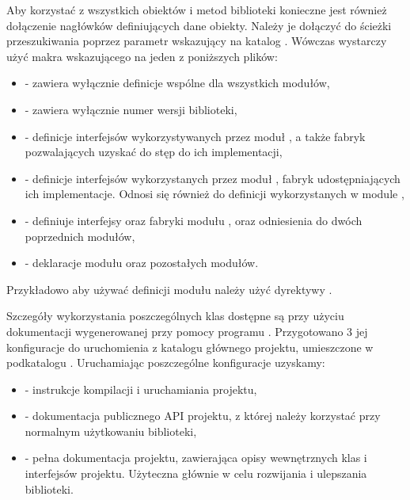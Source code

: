 \documentclass[polish]{standalone}
\begin{document}
Aby korzystać z wszystkich obiektów i metod biblioteki konieczne jest również dołączenie nagłówków definiujących
dane obiekty. Należy je dołączyć do ścieżki przeszukiwania poprzez parametr 
wskazujący na katalog . Wówczas wystarczy użyć makra  wskazującego na jeden z poniższych
plików:
\begin{itemize}
\item {} - zawiera wyłącznie definicje wspólne dla wszystkich modułów,
\item {} - zawiera wyłącznie numer wersji biblioteki,
\item {} - definicje interfejsów wykorzystywanych przez moduł , a także fabryk
pozwalających uzyskać do stęp do ich implementacji,
\item {} - definicje interfejsów wykorzystanych przez moduł , fabryk 
udostępniających ich implementacje. Odnosi się również do definicji wykorzystanych w module ,
\item {} - definiuje interfejsy oraz fabryki modułu , oraz odniesienia do dwóch poprzednich
modułów,
\item {} - deklaracje modułu  oraz pozostałych modułów.
\end{itemize}

Przykładowo aby używać definicji modułu  należy użyć dyrektywy .

Szczegóły wykorzystania poszczególnych klas dostępne są przy użyciu dokumentacji wygenerowanej przy pomocy programu
. Przygotowano 3 jej konfiguracje do uruchomienia z katalogu głównego projektu, umieszczone w podkatalogu
. Uruchamiając poszczególne konfiguracje uzyskamy:
\begin{itemize}
\item {} - instrukcje kompilacji i uruchamiania projektu,
\item {} - dokumentacja publicznego API projektu, z której należy korzystać przy 
normalnym użytkowaniu biblioteki,
\item {} - pełna dokumentacja projektu, zawierająca opisy wewnętrznych klas i 
interfejsów projektu. Użyteczna głównie w celu rozwijania i ulepszania biblioteki.
\end{itemize}
\end{document}
